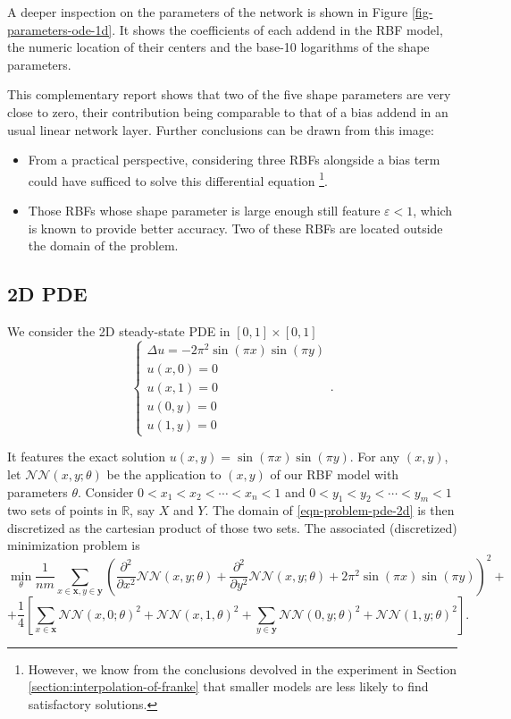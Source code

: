 \documentclass[12pt]{report} %
\newcommand{\tmmathbf}[1]{\ensuremath{\boldsymbol{#1}}}
\newcommand{\mathLaplace}{\Delta}
\begin{document}
A deeper inspection on the parameters of the network is shown in Figure \ref{fig-parameters-ode-1d}.
It shows the coefficients of each addend in the RBF model, the numeric location of
their centers and the base-10 logarithms of the shape parameters.

This complementary report shows that two of the five shape parameters are very close to zero,
their contribution being comparable to that of a bias addend in an usual linear network layer. 
Further conclusions can be drawn from this image:
\begin{itemize}
  \item From a practical perspective, considering three 
  RBFs alongside a bias term could have sufficed to solve this differential equation
  \footnote{However, we know from the conclusions devolved in the experiment in Section
   \ref{section:interpolation-of-franke} that smaller models are less likely to find
   satisfactory solutions.}.
  \item Those RBFs whose shape parameter is large enough still feature $\varepsilon<1$, which is
  known to provide better accuracy. Two of these RBFs are located outside the 
  domain of the problem.
\end{itemize} 

\subsection{2D PDE}

We consider the 2D steady-state PDE in $[0, 1] \times [0, 1]$
\begin{equation}
  \left\{\begin{array}{l}
    \mathLaplace u = - 2 \pi^2 \sin (\pi x) \sin (\pi y)\\
    u (x, 0) = 0\\
    u (x, 1) = 0\\
    u (0, y) = 0\\
    u (1, y) = 0
  \end{array}\right. . \label{eqn-problem-pde-2d}
\end{equation}

It features the exact solution $u (x, y) = \sin (\pi x) \sin (\pi y)$. For any
$(x, y)$, let $\mathcal{N}\mathcal{N} (x, y ; \theta)$ be the application to
$(x, y)$ of our RBF model with parameters $\theta$. Consider $0 < x_1 < x_2 <
\cdots < x_n < 1$ and $0 < y_1 < y_2 < \cdots < y_m < 1$ two sets of points in
$\mathbb{R}$, say $X$ and $Y$. The domain of \eqref{eqn-problem-pde-2d} is
then discretized as the cartesian product of those two sets. The associated (discretized) minimization problem is
   \[ \min_{\theta} \frac{1}{n m} \sum_{x \in \tmmathbf{x}, y \in \tmmathbf{y}}
   \left( \frac{\partial^2}{\partial x^2} \mathcal{N}\mathcal{N} (x, y ;
   \theta) + \frac{\partial^2}{\partial y^2} \mathcal{N}\mathcal{N} (x, y ;
   \theta) + 2 \pi^2 \sin (\pi x) \sin (\pi y) \right)^2 + \]
\[ + \frac{1}{4} \left[ \sum_{x \in \tmmathbf{x}} \mathcal{N}\mathcal{N} (x, 0
   ; \theta)^2 +\mathcal{N}\mathcal{N} (x, 1, \theta)^2 + \sum_{y \in
   \tmmathbf{y}} \mathcal{N}\mathcal{N} (0, y ; \theta)^2
   +\mathcal{N}\mathcal{N} (1, y ; \theta)^2 \right] . \]
\end{document}
